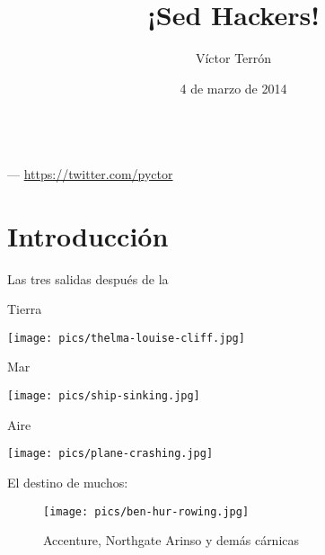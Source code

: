 \documentclass[14pt]{beamer}
\title{¡Sed Hackers!}
\author{Víctor Terrón}
\date{4 de marzo de 2014}
\institute{IAA-CSIC}
\begin{document}
{

\begin{frame}[plain]
  \vspace{6.25cm}
  \begin{TitleBox}
    {\LARGE \inserttitle} \\
    {\small \insertauthor \enspace --- \thinspace \url{https://twitter.com/pyctor}}
  \end{TitleBox}
\end{frame}
}

\section{Introducción}
\begin{frame}{}
\begin{block}{}
    \centering \Large Las tres salidas después de la 
\end{block}
\end{frame}

\begin{frame}{Tierra}
  \begin{center}
    \texttt{[image: pics/thelma-louise-cliff.jpg]}
  \end{center}
\end{frame}

\begin{frame}{Mar}
  \begin{center}
    \texttt{[image: pics/ship-sinking.jpg]}
  \end{center}
\end{frame}

\begin{frame}{Aire}
  \begin{center}
    \texttt{[image: pics/plane-crashing.jpg]}
  \end{center}
\end{frame}

\begin{frame}{}
\begin{block}{}
    \centering \Large El destino de muchos: 
\end{block}
\begin{figure}
  \centering
  \texttt{[image: pics/ben-hur-rowing.jpg]}
  \caption*{Accenture, Northgate Arinso y demás cárnicas}
\end{figure}
\end{frame}
\end{document}
